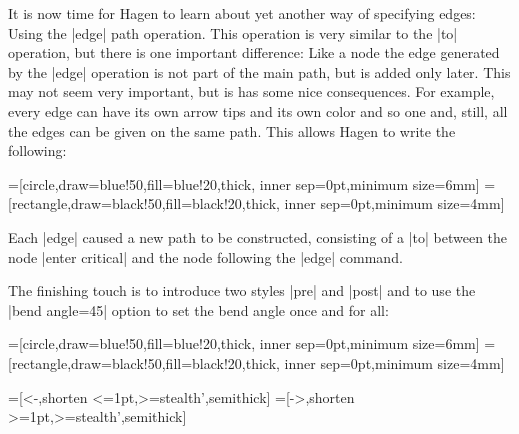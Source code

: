 It is now time for Hagen to learn about yet another way of specifying
edges: Using the |edge| path operation. This operation is very similar
to the |to| operation, but there is one important difference: Like a
node the edge generated by the |edge| operation is not part of the
main path, but is added only later. This may not seem very important,
but is has some nice consequences. For example, every edge can have
its own arrow tips and its own color and so one and, still, all the
edges can be given on the same path. This allows Hagen to write the
following: 


{
=[circle,draw=blue!50,fill=blue!20,thick,
                   inner sep=0pt,minimum size=6mm]
=[rectangle,draw=black!50,fill=black!20,thick,
                        inner sep=0pt,minimum size=4mm]
\begin{codeexample}[]
\end{codeexample}
}

Each |edge| caused a new path to be constructed, consisting of a |to|
between the node |enter critical| and the node following the |edge|
command.

The finishing touch is to introduce two styles |pre| and |post| and to
use the |bend angle=45| option to set the bend angle once and for all:

{
=[circle,draw=blue!50,fill=blue!20,thick,
                   inner sep=0pt,minimum size=6mm]
=[rectangle,draw=black!50,fill=black!20,thick,
                        inner sep=0pt,minimum size=4mm]
\begin{codeexample}[]
=[<-,shorten <=1pt,>=stealth',semithick]  
=[->,shorten >=1pt,>=stealth',semithick]  
\end{codeexample}
}




